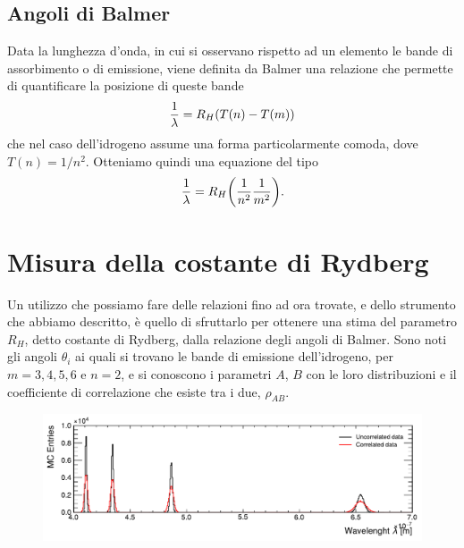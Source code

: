 \documentclass[a4paper,preprintnumbers,aps,citeautoscript,notitlepage,12pt,tightenlines]{revtex4-2}
\begin{document}
\subsection{Angoli di Balmer}

Data la lunghezza d'onda, in cui si osservano rispetto ad un elemento le bande di assorbimento o di emissione, viene definita da Balmer una relazione che permette di quantificare la posizione di queste bande \begin{equation} \frac{1}{\lambda} = R_H \qty(T(n) - T(m)) \end{equation} che nel caso dell'idrogeno assume una forma particolarmente comoda, dove $T(n) = 1/n^2$. Otteniamo quindi una equazione del tipo \begin{equation} \frac{1}{\lambda} = R_H \qty(\frac{1}{n^2} \frac{1}{m^2}). \end{equation}

\section{Misura della costante di Rydberg}

Un utilizzo che possiamo fare delle relazioni fino ad ora trovate, e dello strumento che abbiamo descritto, è quello di sfruttarlo per ottenere una stima del parametro $R_H$, detto costante di Rydberg, dalla relazione degli angoli di Balmer. Sono noti gli angoli $\theta_i$ ai quali si trovano le bande di emissione dell'idrogeno, per $m = 3, 4, 5, 6$ e $n=2$, e si conoscono i parametri $A$, $B$ con le loro distribuzioni e il coefficiente di correlazione che esiste tra i due, $\rho_{AB}$. 

\begin{figure}
\centering
\includegraphics[width=\linewidth]{../tasks/wavelenght}
\caption{}
\end{figure}
\end{document}

